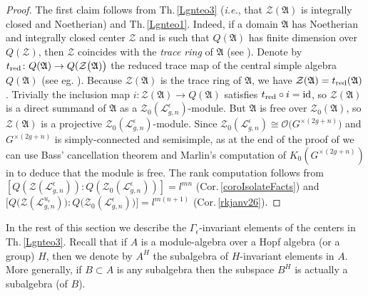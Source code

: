 \documentclass[11pt]{amsart}
\newcommand{\e}{\epsilon}
\newcommand{\Ll}{\mathcal{L}}
\begin{document}
\begin{proof} The first claim follows from Th.\,\ref{Lgnteo3}  ({\it i.e.}, that $\mathcal{Z}(\mathfrak{A})$ is integrally closed and Noetherian) and Th.\,\ref{Lgnteo1}. Indeed, if a domain $\mathfrak{A}$ has Noetherian and integrally closed center $\mathcal{Z}$ and is such that $Q(\mathfrak{A})$ has finite dimension over $Q(\mathcal{Z})$, then $\mathcal{Z}$ coincides with the {\it trace ring} of $\mathfrak{A}$ (see \cite[Th.\,10.1]{Reiner}). Denote by $t_{\rm red}\colon Q(\mathfrak{A}) \rightarrow Q(\mathcal{Z}\bigl( \mathfrak{A}) \bigr)$ the reduced trace map of the central simple algebra $Q(\mathfrak{A})$ (see eg. \cite[\S 9]{Reiner}). Because $\mathcal{Z}(\mathfrak{A})$ is the trace ring of $\mathfrak{A}$, we have $\mathcal{Z}(\mathfrak{A}) = t_{\rm red}(\mathfrak{A})$. Trivially the inclusion map $i\colon \mathcal{Z}(\mathfrak{A})\rightarrow Q(\mathfrak{A})$ satisfies $t_{\rm red} \circ i = \mathrm{id}$, so $\mathcal{Z}(\mathfrak{A})$ is a direct summand of $\mathfrak{A}$ as a $\mathcal{Z}_0(\mathcal{L}_{g,n}^{\e})$-module. But $\mathfrak{A}$ is free over $\mathcal{Z}_0(\mathfrak{A})$, so $\mathcal{Z}(\mathfrak{A})$ is a projective $\mathcal{Z}_0(\mathcal{L}_{g,n}^{\e})$-module. Since $\mathcal{Z}_0(\mathcal{L}_{g,n}^{\e}) \cong \mathcal{O}\bigl( G^{\times (2g+n)} \bigr)$ and $G^{\times (2g+n)}$ is simply-connected and semisimple, as at the end of the proof of \cite[Th.\,4.9]{BR2} we can use Bass' cancellation theorem and Marlin's computation of $K_0(G^{\times (2g+n)})$ in \cite{Marlin} to deduce that the module is free. The rank computation follows from $[Q(\mathcal{Z}(\mathcal{L}_{g,n}^{\e})):Q(\mathcal{Z}_0(\mathcal{L}_{g,n}^{\e}))]=l^{mn}$ (Cor.\,\ref{coroIsolateFacts}) and $\bigl[ Q\bigl(\mathcal{Z}(\Ll_{g,n}^{u_\e})\bigr):Q\bigl(\mathcal{Z}_0(\Ll_{g,n}^{\e})\bigr) \bigr] = l^{m(n+1)}$ (Cor.\,\ref{rkjanv26}). 
\end{proof}

In the rest of this section we describe the $\Gamma_\e$-invariant elements of the centers in Th.\,\ref{Lgnteo3}. Recall that if $A$ is a module-algebra over a Hopf algebra (or a group) $H$, then we denote by $A^H$ the subalgebra of $H$-invariant elements in $A$. More generally, if $B \subset A$ is any subalgebra then the subspace $B^H$ is actually a subalgebra (of $B$).
\end{document}
